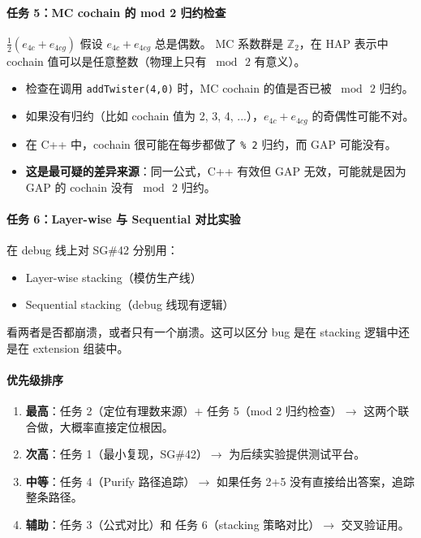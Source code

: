 \documentclass[a4paper,fontset=ubuntu,12pt]{ctexart}
\begin{document}
\paragraph{任务 5：MC cochain 的 mod 2 归约检查}
$\frac{1}{2}(e_{4c}+e_{4cg})$ 假设 $e_{4c}+e_{4cg}$ 总是偶数。
MC 系数群是 $\mathbb{Z}_2$，在 HAP 表示中 cochain 值可以是任意整数（物理上只有 $\bmod\,2$ 有意义）。
\begin{itemize}
\item 检查在调用 \texttt{addTwister(4,0)} 时，MC cochain 的值是否已被 $\bmod\,2$ 归约。
\item 如果没有归约（比如 cochain 值为 2, 3, 4, ...），$e_{4c}+e_{4cg}$ 的奇偶性可能不对。
\item 在 C++ 中，cochain 很可能在每步都做了 \texttt{\% 2} 归约，而 GAP 可能没有。
\item \textbf{这是最可疑的差异来源}：同一公式，C++ 有效但 GAP 无效，可能就是因为 GAP 的 cochain 没有 $\bmod\,2$ 归约。
\end{itemize}

\paragraph{任务 6：Layer-wise 与 Sequential 对比实验}
在 debug 线上对 SG\#42 分别用：
\begin{itemize}
\item Layer-wise stacking（模仿生产线）
\item Sequential stacking（debug 线现有逻辑）
\end{itemize}
看两者是否都崩溃，或者只有一个崩溃。这可以区分 bug 是在 stacking 逻辑中还是在 extension 组装中。

\paragraph{优先级排序}

\begin{enumerate}
\item \textbf{最高}：任务 2（定位有理数来源）$+$ 任务 5（mod 2 归约检查）$\to$ 这两个联合做，大概率直接定位根因。
\item \textbf{次高}：任务 1（最小复现，SG\#42）$\to$ 为后续实验提供测试平台。
\item \textbf{中等}：任务 4（Purify 路径追踪）$\to$ 如果任务 2+5 没有直接给出答案，追踪整条路径。
\item \textbf{辅助}：任务 3（公式对比）和 任务 6（stacking 策略对比）$\to$ 交叉验证用。
\end{enumerate}
\end{document}
